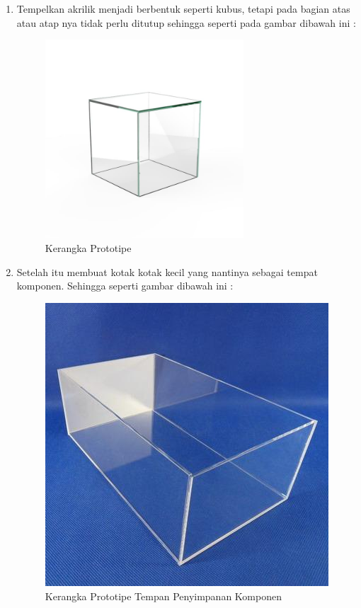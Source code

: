 \begin{enumerate}
    \item Tempelkan akrilik menjadi berbentuk seperti kubus, tetapi pada bagian atas atau atap nya tidak perlu ditutup sehingga seperti pada gambar dibawah ini : 
    

\begin{figure}[H]
\centering
\includegraphics[width=0.7\textwidth]{figures/kubus.jpg}
\caption{Kerangka Prototipe}
\label{print}
\end{figure}

\item Setelah itu membuat kotak kotak kecil yang nantinya sebagai tempat komponen. Sehingga seperti gambar dibawah ini :


\begin{figure}[H]
\centering
\includegraphics[width=1\textwidth]{figures/kubus2.jpg}
\caption{Kerangka Prototipe Tempan Penyimpanan Komponen }
\label{print}
\end{figure}


\end{enumerate}
